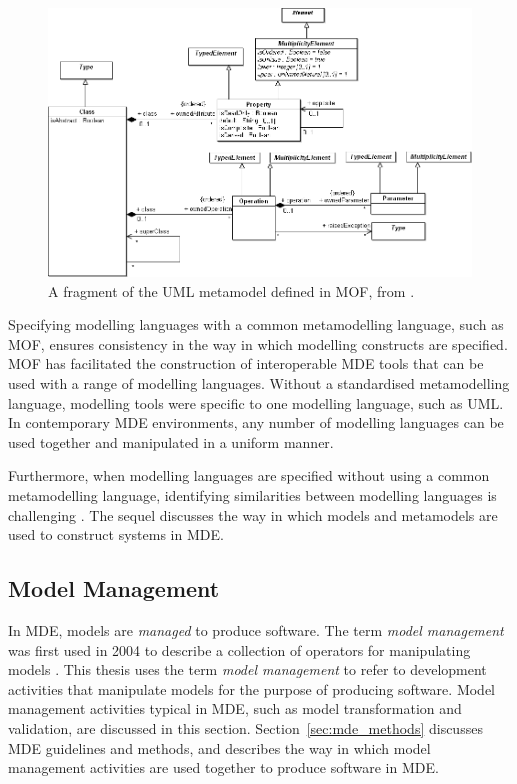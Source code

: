 \begin{landscape}	
	\begin{figure}[htbp]
	  \begin{center}
	    \leavevmode
	    \includegraphics[scale=0.5]{2.Background/images/mof.png}
	  \end{center}
	  \caption[A fragment of the UML metamodel defined in MOF]{A fragment of the UML metamodel defined in MOF, from \cite{uml212}.}
	  \label{fig:mof}
	\end{figure}
\end{landscape}

Specifying modelling languages with a common metamodelling language, such as MOF, ensures consistency in the way in which modelling constructs are specified. MOF has facilitated the construction of interoperable MDE tools that can be used with a range of modelling languages. Without a standardised metamodelling language, modelling tools were specific to one modelling language, such as UML. In contemporary MDE environments, any number of modelling languages can be used together and manipulated in a uniform manner.

Furthermore, when modelling languages are specified without using a common metamodelling language, identifying similarities between modelling languages is challenging \cite[pg97]{frankel02mda}. The sequel discusses the way in which models and metamodels are used to construct systems in MDE.

\subsection{Model Management}
\label{sec:mde}
In MDE, models are \emph{managed} to produce software. The \cc term \emph{model management} was first used in 2004 to describe a collection of operators for manipulating models \cite{melnik04thesis}. This thesis uses the term \emph{model management} to refer to development activities that manipulate models for the purpose of producing software. Model management activities typical in MDE, such as model transformation and validation, are discussed in this section. Section~\ref{sec:mde_methods} discusses MDE guidelines and methods, and describes the way in which model management activities are used together to produce software in MDE.

